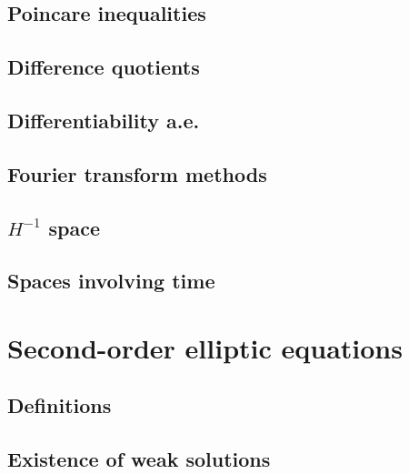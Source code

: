 \documentclass[a4paper,12pt]{report}
\begin{document}
\subsection{Poincare inequalities}

\subsection{Difference quotients}

\subsection{Differentiability a.e.}

\subsection{Fourier transform methods}

\subsection{$H^{-1}$ space}

\subsection{Spaces involving time}


\section{Second-order elliptic equations}
\subsection{Definitions}

\subsection{Existence of weak solutions}
\end{document}
